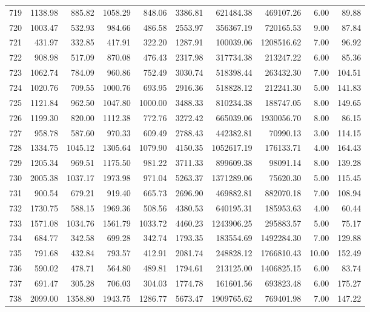\begin{tabular}{lrrrrrrrrr}
719 & 1138.98 & 885.82 & 1058.29 & 848.06 & 3386.81 & 621484.38 & 469107.26 & 6.00 & 89.88 \\
720 & 1003.47 & 532.93 & 984.66 & 486.58 & 2553.97 & 356367.19 & 720165.53 & 9.00 & 87.84 \\
721 & 431.97 & 332.85 & 417.91 & 322.20 & 1287.91 & 100039.06 & 1208516.62 & 7.00 & 96.92 \\
722 & 908.98 & 517.09 & 870.08 & 476.43 & 2317.98 & 317734.38 & 213247.22 & 6.00 & 85.36 \\
723 & 1062.74 & 784.09 & 960.86 & 752.49 & 3030.74 & 518398.44 & 263432.30 & 7.00 & 104.51 \\
724 & 1020.76 & 709.55 & 1000.76 & 693.95 & 2916.36 & 518828.12 & 212241.30 & 5.00 & 141.83 \\
725 & 1121.84 & 962.50 & 1047.80 & 1000.00 & 3488.33 & 810234.38 & 188747.05 & 8.00 & 149.65 \\
726 & 1199.30 & 820.00 & 1112.38 & 772.76 & 3272.42 & 665039.06 & 1930056.70 & 8.00 & 86.15 \\
727 & 958.78 & 587.60 & 970.33 & 609.49 & 2788.43 & 442382.81 & 70990.13 & 3.00 & 114.15 \\
728 & 1334.75 & 1045.12 & 1305.64 & 1079.90 & 4150.35 & 1052617.19 & 176133.71 & 4.00 & 164.43 \\
729 & 1205.34 & 969.51 & 1175.50 & 981.22 & 3711.33 & 899609.38 & 98091.14 & 8.00 & 139.28 \\
730 & 2005.38 & 1037.17 & 1973.98 & 971.04 & 5263.37 & 1371289.06 & 75620.30 & 5.00 & 115.45 \\
731 & 900.54 & 679.21 & 919.40 & 665.73 & 2696.90 & 469882.81 & 882070.18 & 7.00 & 108.94 \\
732 & 1730.75 & 588.15 & 1969.36 & 508.56 & 4380.53 & 640195.31 & 185953.63 & 4.00 & 60.44 \\
733 & 1571.08 & 1034.76 & 1561.79 & 1033.72 & 4460.23 & 1243906.25 & 295883.57 & 5.00 & 75.17 \\
734 & 684.77 & 342.58 & 699.28 & 342.74 & 1793.35 & 183554.69 & 1492284.30 & 7.00 & 129.88 \\
735 & 791.68 & 432.84 & 793.57 & 412.91 & 2081.74 & 248828.12 & 1766810.43 & 10.00 & 152.49 \\
736 & 590.02 & 478.71 & 564.80 & 489.81 & 1794.61 & 213125.00 & 1406825.15 & 6.00 & 83.74 \\
737 & 691.47 & 305.28 & 706.03 & 304.03 & 1774.78 & 161601.56 & 693823.48 & 6.00 & 175.27 \\
738 & 2099.00 & 1358.80 & 1943.75 & 1286.77 & 5673.47 & 1909765.62 & 769401.98 & 7.00 & 147.22 \\

\end{tabular}
